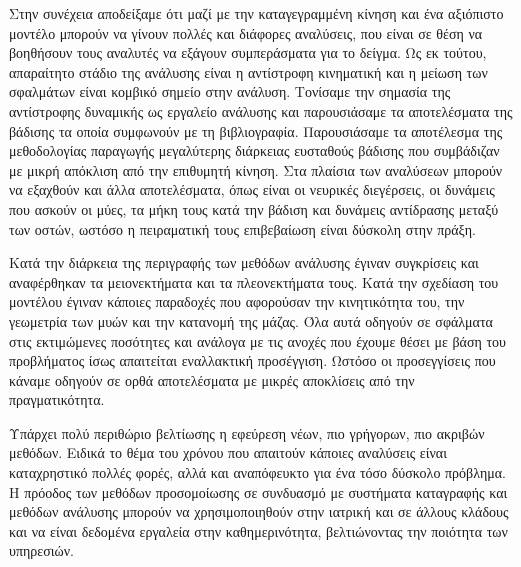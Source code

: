 Στην συνέχεια αποδείξαμε ότι μαζί με την καταγεγραμμένη κίνηση και ένα αξιόπιστο μοντέλο μπορούν να γίνουν πολλές και διάφορες αναλύσεις, που είναι σε θέση να βοηθήσουν τους αναλυτές να εξάγουν συμπεράσματα για το δείγμα. Ως εκ τούτου, απαραίτητο στάδιο της ανάλυσης είναι η αντίστροφη κινηματική και η μείωση των σφαλμάτων είναι κομβικό σημείο στην ανάλυση. Τονίσαμε την σημασία της αντίστροφης δυναμικής ως εργαλείο ανάλυσης και παρουσιάσαμε τα αποτελέσματα της βάδισης τα οποία συμφωνούν με τη βιβλιογραφία. Παρουσιάσαμε τα αποτέλεσμα της μεθοδολογίας παραγωγής μεγαλύτερης διάρκειας ευσταθούς βάδισης που συμβάδιζαν με μικρή απόκλιση από την επιθυμητή κίνηση. Στα πλαίσια των αναλύσεων μπορούν να εξαχθούν και άλλα αποτελέσματα, όπως είναι οι νευρικές διεγέρσεις, οι δυνάμεις που ασκούν οι μύες, τα μήκη τους κατά την βάδιση και δυνάμεις αντίδρασης μεταξύ των οστών, ωστόσο η πειραματική τους επιβεβαίωση είναι δύσκολη στην πράξη.

Κατά την διάρκεια της περιγραφής των μεθόδων ανάλυσης έγιναν συγκρίσεις και αναφέρθηκαν τα μειονεκτήματα και τα πλεονεκτήματα τους. Κατά την σχεδίαση του μοντέλου έγιναν κάποιες παραδοχές που αφορούσαν την κινητικότητα του, την γεωμετρία των μυών και την κατανομή της μάζας. Όλα αυτά οδηγούν σε σφάλματα στις εκτιμώμενες ποσότητες και ανάλογα με τις ανοχές που έχουμε θέσει με βάση του προβλήματος ίσως απαιτείται εναλλακτική προσέγγιση. Ωστόσο οι προσεγγίσεις που κάναμε οδηγούν σε ορθά αποτελέσματα με μικρές αποκλίσεις από την πραγματικότητα.

Υπάρχει πολύ περιθώριο βελτίωσης η εφεύρεση νέων, πιο γρήγορων, πιο ακριβών μεθόδων. Ειδικά το θέμα του χρόνου που απαιτούν κάποιες αναλύσεις είναι καταχρηστικό πολλές φορές, αλλά και αναπόφευκτο για ένα τόσο δύσκολο πρόβλημα. Η πρόοδος των μεθόδων προσομοίωσης σε συνδυασμό με συστήματα καταγραφής και μεθόδων ανάλυσης μπορούν να χρησιμοποιηθούν στην ιατρική και σε άλλους κλάδους και να είναι δεδομένα εργαλεία στην καθημερινότητα, βελτιώνοντας την ποιότητα των υπηρεσιών.
